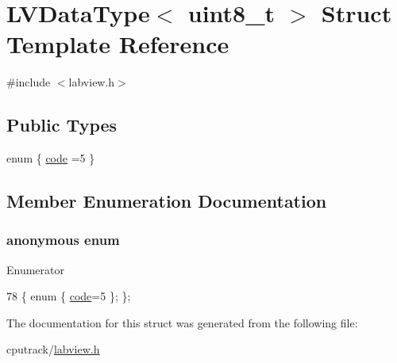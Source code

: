 \hypertarget{struct_l_v_data_type_3_01uint8__t_01_4}{}\section{L\+V\+Data\+Type$<$ uint8\+\_\+t $>$ Struct Template Reference}
\label{struct_l_v_data_type_3_01uint8__t_01_4}


{\ttfamily \#include $<$labview.\+h$>$}

\subsection*{Public Types}
\begin{DoxyCompactItemize}
\item 
enum \{ \hyperlink{struct_l_v_data_type_3_01uint8__t_01_4_a7db9c38d2b9623e7fed66c60e775afcea0413e74d311e8612a4279f109fa61fe0}{code} =5
 \}
\end{DoxyCompactItemize}


\subsection{Member Enumeration Documentation}
\subsubsection[{\texorpdfstring{anonymous enum}{anonymous enum}}]{\setlength{\rightskip}{0pt plus 5cm}anonymous enum}\hypertarget{struct_l_v_data_type_3_01uint8__t_01_4_a7db9c38d2b9623e7fed66c60e775afce}{}\label{struct_l_v_data_type_3_01uint8__t_01_4_a7db9c38d2b9623e7fed66c60e775afce}
\begin{Desc}
\item[Enumerator]\par
\begin{description}
\item[{\em 
code\hypertarget{struct_l_v_data_type_3_01uint8__t_01_4_a7db9c38d2b9623e7fed66c60e775afcea0413e74d311e8612a4279f109fa61fe0}{}\label{struct_l_v_data_type_3_01uint8__t_01_4_a7db9c38d2b9623e7fed66c60e775afcea0413e74d311e8612a4279f109fa61fe0}
}]\end{description}
\end{Desc}

\begin{DoxyCode}
78 \{ \textcolor{keyword}{enum} \{ \hyperlink{struct_l_v_data_type_3_01uint8__t_01_4_a7db9c38d2b9623e7fed66c60e775afcea0413e74d311e8612a4279f109fa61fe0}{code}=5 \}; \};
\end{DoxyCode}


The documentation for this struct was generated from the following file\+:\begin{DoxyCompactItemize}
\item 
cputrack/\hyperlink{labview_8h}{labview.\+h}\end{DoxyCompactItemize}
